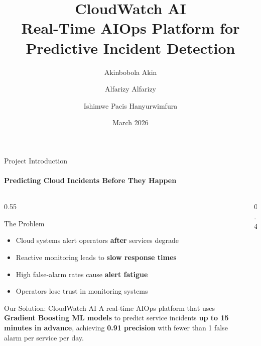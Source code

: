 \documentclass[aspectratio=169,11pt]{beamer}
\title[CloudWatch AI]{CloudWatch AI\\Real-Time AIOps Platform for Predictive Incident Detection}
\author[Akin, Alfarizy, Hanyurwimfura]{Akinbobola Akin \and Alfarizy Alfarizy \and Ishimwe Pacis Hanyurwimfura}
\institute[UNB]{University of New Brunswick \\ CS6905 -- Cloud Information Management Systems}
\date[Mar 2026]{March 2026}
\begin{document}
\begin{frame}
\titlepage
\end{frame}

\begin{frame}[shrink=2]{Project Introduction}
\framesubtitle{Predicting Cloud Incidents Before They Happen}

\begin{columns}
\begin{column}{0.55\textwidth}
\begin{block}{The Problem}
\begin{itemize}
    \item Cloud systems alert operators \textbf{after} services degrade
    \item Reactive monitoring leads to \textbf{slow response times}
    \item High false-alarm rates cause \textbf{alert fatigue}
    \item Operators lose trust in monitoring systems
\end{itemize}
\end{block}

\vspace{0.5em}
\begin{alertblock}{Our Solution: CloudWatch AI}
A real-time AIOps platform that uses \textbf{Gradient Boosting ML models} to predict service incidents \textbf{up to 15 minutes in advance}, achieving \textbf{0.91 precision} with fewer than 1 false alarm per service per day.
\end{alertblock}
\end{column}

\begin{column}{0.4\textwidth}
\centering
{}
\end{column}
\end{columns}
\end{frame}
\end{document}
